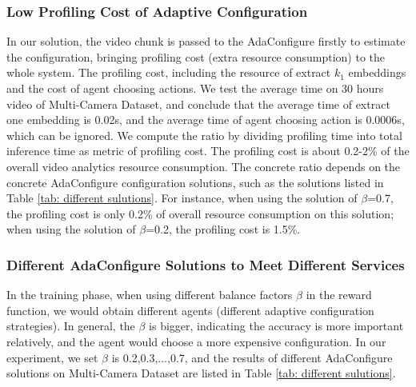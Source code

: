 \subsubsection{Low Profiling Cost of Adaptive Configuration}
\label{subsec: profiling cost}
In our solution, the video chunk is passed to the AdaConfigure firstly to estimate the configuration, bringing profiling cost (extra resource consumption) to the whole system. 
The profiling cost, including the resource of extract $k_1$ embeddings and the cost of agent choosing actions. We test the average time on 30 hours video of Multi-Camera Dataset, and conclude that the average time of extract one embedding is 0.02s, and the average time of agent choosing action is 0.0006s, which can be ignored. We compute the ratio by dividing profiling time into total inference time as metric of profiling cost.
The profiling cost is about 0.2-2\% of the overall video analytics resource consumption. The concrete ratio depends on the concrete AdaConfigure configuration solutions, such as the solutions listed in Table \ref{tab: different sulutions}. For instance, when using the solution of $\beta$=0.7, the profiling cost is only 0.2\% of overall resource consumption on this solution; when using the solution of $\beta$=0.2, the profiling cost is 1.5\%.       

\subsubsection{Different AdaConfigure Solutions to Meet Different Services}
\label{subsec: different sulutions}
In the training phase, when using different balance factors $\beta$ in the reward function, we would obtain different agents (different adaptive configuration strategies). 
In general, the $\beta$ is bigger, indicating the accuracy is more important relatively, and the agent would choose a more expensive configuration. In our experiment, we set $\beta$ is 0.2,0.3,...,0.7, and the results of different AdaConfigure solutions on Multi-Camera Dataset are listed in Table \ref{tab: different sulutions}. 

